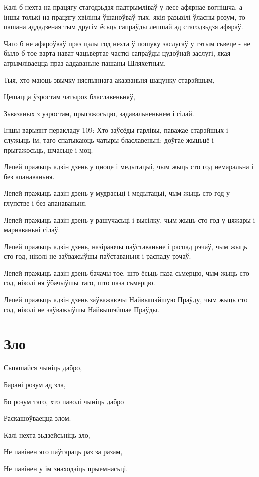 \documentclass{article}
\begin{document}
Калі б нехта на працягу стагодзьдзя падтрымліваў у лесе афярнае
вогнішча, а іншы толькі на працягу хвіліны ўшаноўваў тых, якія разьвілі
ўласны розум, то пашана аддадзеная тым другім ёсьць сапраўды лепшай ад
стагодзьдзя афяраў.

Чаго б не афяроўваў праз цэлы год нехта ў пошуку заслугаў у гэтым
сьвеце - не было б тое варта нават чацьвёртае часткі сапраўды цудоўнай
заслугі, якая атрымліваецца праз аддаваньне пашаны Шляхетным.

Тыя, хто маюць звычку няспыннага аказваньня шацунку старэйшым,

Цешацца ўзростам чатырох блаславеньняў,

Зьвязаных з узростам, прыгажосьцю, задавальненьнем і сілай.

Іншы варыянт перакладу 109: Хто заўсёды гарлівы, паважае старэйшых і
служыць ім, таго спатыкаюць чатыры блаславеньні: доўгае жыцьцё і
прыгажосьць, шчасьце і моц.

Лепей пражыць адзін дзень у цноце і медытацыі, чым жыць сто год
немаральна і без апанаваньня.

Лепей пражыць адзін дзень у мудрасьці і медытацыі, чым жыць сто год
у глупстве і без апанаваньня.

Лепей пражыць адзін дзень у рашучасьці і высілку, чым жыць сто год
у цяжары і марнаваньні сілаў.

Лепей пражыць адзін дзень, назіраючы паўставаньне і распад рэчаў,
чым жыць сто год, ніколі не заўважыўшы паўставаньня і распаду рэчаў.

Лепей пражыць адзін дзень бачачы тое, што ёсьць паза сьмерцю, чым
жыць сто год, ніколі ня ўбачыўшы таго, што паза сьмерцю.

Лепей пражыць адзін дзень заўважаючы Найвышэйшую Праўду, чым жыць
сто год, ніколі не заўважыўшы Найвышэйшае Праўды.

\section{Зло}

Сьпяшайся чыніць дабро,

Барані розум ад зла,

Бо розум таго, хто паволі чыніць дабро

Раскашоўваецца злом.

Калі нехта зьдзейсьніць зло,

Не павінен яго паўтараць раз за разам,

Не павінен у ім знаходзіць прыемнасьці.
\end{document}
